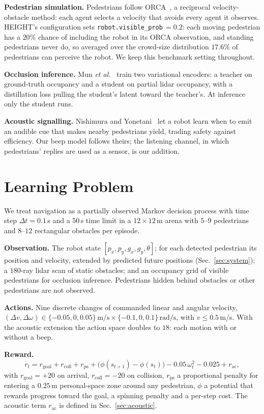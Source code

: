 \documentclass[conference]{IEEEtran}
\begin{document}
\textbf{Pedestrian simulation.} Pedestrians follow ORCA~\cite{orca}, a reciprocal
velocity-obstacle method: each agent selects a velocity that avoids every agent it observes.
HEIGHT's configuration sets \texttt{robot.visible\_prob}\,$=0.2$: each moving pedestrian has a
$20\%$ chance of including the robot in its ORCA observation, and standing pedestrians never
do, so averaged over the crowd-size distribution $17.6\%$ of pedestrians can perceive the robot.
We keep this benchmark setting throughout.

\textbf{Occlusion inference.} Mun \emph{et al.}~\cite{pas} train two variational encoders: a
teacher on ground-truth occupancy and a student on partial lidar occupancy, with a distillation
loss pulling the student's latent toward the teacher's. At inference only the student runs.

\textbf{Acoustic signalling.} Nishimura and Yonetani~\cite{l2b} let a robot learn when to emit
an audible cue that makes nearby pedestrians yield, trading safety against efficiency. Our beep
model follows theirs; the listening channel, in which pedestrians' replies are used as a
sensor, is our addition.

\section{Learning Problem}
\label{sec:formulation}

We treat navigation as a partially observed Markov decision process with time step
$\Delta t=0.1$\,s and a $50$\,s time limit in a $12\times12$\,m arena with $5$--$9$ pedestrians and
$8$--$12$ rectangular obstacles per episode.

\textbf{Observation.} The robot state $[p_x,p_y,g_x,g_y,\theta]$; for each detected pedestrian
its position and velocity, extended by predicted future positions (Sec.~\ref{sec:system}); a
$180$-ray lidar scan of static obstacles; and an occupancy grid of visible pedestrians for
occlusion inference. Pedestrians hidden behind obstacles or other pedestrians are not observed.

\textbf{Actions.} Nine discrete changes of commanded linear and angular velocity,
$(\Delta v,\Delta\omega)\in\{-0.05,0,0.05\}\,\mathrm{m/s}\times\{-0.1,0,0.1\}\,\mathrm{rad/s}$, with
$v\le0.5$\,m/s. With the acoustic extension the action space doubles to $18$: each motion
with or without a beep.

\textbf{Reward.}
\begin{equation}
r_t = r_{\text{goal}} + r_{\text{coll}} + r_{\text{ps}} + \big(\phi(s_{t+1})-\phi(s_t)\big)
      - 0.05\,\omega_t^2 - 0.025 + r_{\text{ac}},
\end{equation}
with $r_{\text{goal}}=+20$ on arrival, $r_{\text{coll}}=-20$ on collision, $r_{\text{ps}}$ a
proportional penalty for entering a $0.25$\,m personal-space zone around any pedestrian,
$\phi$ a potential that rewards progress toward the goal, a spinning penalty and a per-step
cost. The acoustic term $r_{\text{ac}}$ is defined in Sec.~\ref{sec:acoustic}.
\end{document}
